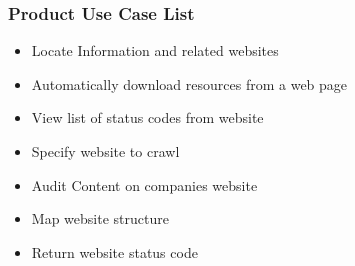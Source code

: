 \documentclass[titlepage]{article}
\begin{document}
\subsubsection*{Product Use Case List  }
\begin{itemize}
  \item Locate Information and related websites
  \item Automatically download resources from a web page
  \item View list of status codes from website 
  \item Specify website to crawl
  \item Audit Content on companies website 
  \item Map website structure
  \item Return website status code
\end{itemize}
\end{document}
